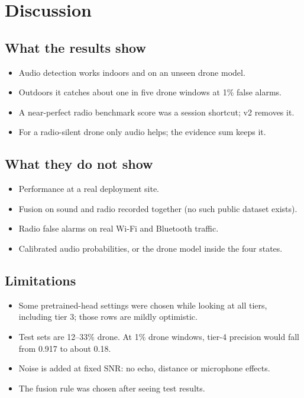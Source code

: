 \documentclass[conference,a4paper]{IEEEtran}
\begin{document}
\section{Discussion}

\subsection{What the results show}
\begin{itemize}
  \item Audio detection works indoors and on an unseen drone model.
  \item Outdoors it catches about one in five drone windows at 1\% false alarms.
  \item A near-perfect radio benchmark score was a session shortcut; v2 removes it.
  \item For a radio-silent drone only audio helps; the evidence sum keeps it.
\end{itemize}

\subsection{What they do not show}
\begin{itemize}
  \item Performance at a real deployment site.
  \item Fusion on sound and radio recorded together (no such public dataset exists).
  \item Radio false alarms on real Wi-Fi and Bluetooth traffic.
  \item Calibrated audio probabilities, or the drone model inside the four states.
\end{itemize}

\subsection{Limitations}
\begin{itemize}
  \item Some pretrained-head settings were chosen while looking at all tiers, including tier 3;
        those rows are mildly optimistic.
  \item Test sets are 12--33\% drone. At 1\% drone windows, tier-4 precision would fall from 0.917
        to about 0.18.
  \item Noise is added at fixed SNR: no echo, distance or microphone effects.
  \item The fusion rule was chosen after seeing test results.
\end{itemize}
\end{document}
